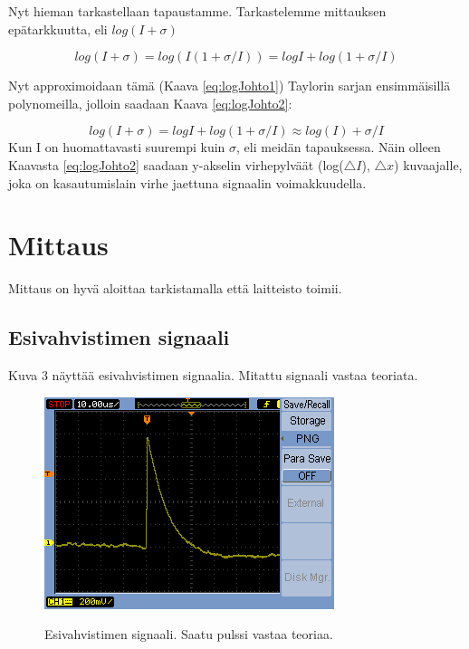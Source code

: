 \documentclass[a4paper, 12pt]{article}
\begin{document}
Nyt hieman tarkastellaan tapaustamme. Tarkastelemme mittauksen epätarkkuutta, eli $log(I+\sigma)$

\begin{equation}
log(I+\sigma)=log(I(1+\sigma /I))=log I + log(1+\sigma /I)
\label{eq:logJohto1}
\end{equation}

Nyt approximoidaan tämä (Kaava \ref{eq:logJohto1}) Taylorin sarjan ensimmäisillä polynomeilla, jolloin saadaan Kaava \ref{eq:logJohto2}:

\begin{equation}
log(I+\sigma)=log I + log(1+\sigma /I) \approx log(I) + \sigma /I
\label{eq:logJohto2}
\end{equation}
Kun I on huomattavasti suurempi kuin $\sigma$, eli meidän tapauksessa. Näin olleen Kaavasta \ref{eq:logJohto2} saadaan y-akselin virhepylväät (log($\triangle I$), $\triangle x$) kuvaajalle, joka on kasautumislain virhe jaettuna signaalin voimakkuudella. 

\section{Mittaus}
Mittaus on hyvä aloittaa tarkistamalla että laitteisto toimii.
\subsection{Esivahvistimen signaali}

Kuva 3 näyttää esivahvistimen signaalia. Mitattu signaali vastaa teoriata.

\begin{figure}[!hbt]
\includegraphics[scale=1.2]{EsivahvistinSignaali}
\label{fig:EsivahvistimenSignaali}
\caption{Esivahvistimen signaali. Saatu pulssi vastaa teoriaa. \cite{TyoMoniste}}
\end{figure}
\end{document}
